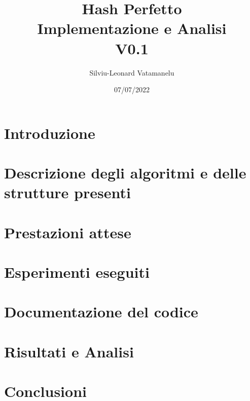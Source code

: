 \documentclass[11pt]{article}
\title{%
    Hash Perfetto \\
    \large Implementazione e Analisi \\
    \small V0.1}
\author{ Silviu-Leonard Vatamanelu }
\date{07/07/2022}
\begin{document}
\maketitle	
\pagebreak

\tableofcontents
\pagebreak

\section{Introduzione}

\pagebreak

\section{Descrizione degli algoritmi e delle strutture presenti}

\pagebreak

\section{Prestazioni attese}

\pagebreak

\section{Esperimenti eseguiti}

\pagebreak

\section{Documentazione del codice}

\pagebreak

\section{Risultati e Analisi}

\pagebreak

\section{Conclusioni}

\pagebreak
\end{document}

